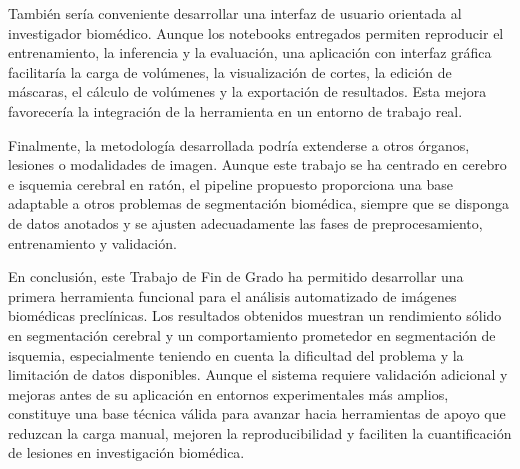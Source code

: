 También sería conveniente desarrollar una interfaz de usuario orientada al investigador biomédico. Aunque los notebooks entregados permiten reproducir el entrenamiento, la
inferencia y la evaluación, una aplicación con interfaz gráfica facilitaría la carga de volúmenes, la visualización de cortes, la edición de máscaras, el cálculo de volúmenes
y la exportación de resultados. Esta mejora favorecería la integración de la herramienta en un entorno de trabajo real.

Finalmente, la metodología desarrollada podría extenderse a otros órganos, lesiones o modalidades de imagen. Aunque este trabajo se ha centrado en cerebro e isquemia
cerebral en ratón, el pipeline propuesto proporciona una base adaptable a otros problemas de segmentación biomédica, siempre que se disponga de datos anotados y se ajusten
adecuadamente las fases de preprocesamiento, entrenamiento y validación.

En conclusión, este Trabajo de Fin de Grado ha permitido desarrollar una primera herramienta funcional para el análisis automatizado de imágenes biomédicas preclínicas.
Los resultados obtenidos muestran un rendimiento sólido en segmentación cerebral y un comportamiento prometedor en segmentación de isquemia, especialmente teniendo en 
cuenta la dificultad del problema y la limitación de datos disponibles. Aunque el sistema requiere validación adicional y mejoras antes de su aplicación en entornos experimentales
más amplios, constituye una base técnica válida para avanzar hacia herramientas de apoyo que reduzcan la carga manual, mejoren la reproducibilidad y faciliten la cuantificación de 
lesiones en investigación biomédica.


